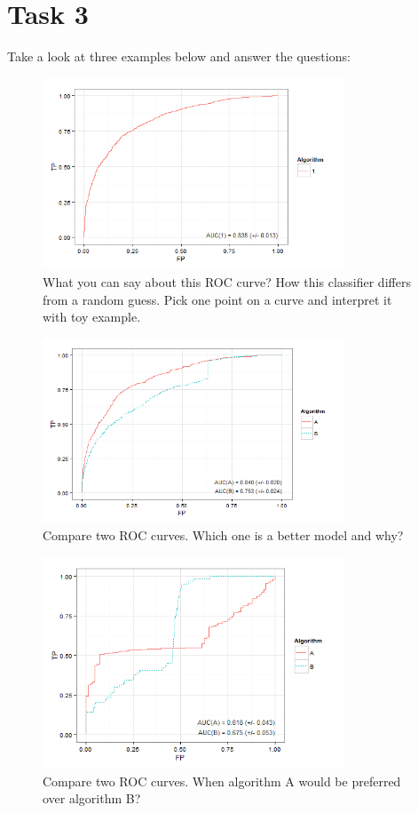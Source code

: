 \documentclass{article}
\begin{document}
\section*{Task 3}
Take a look at three examples below and answer the questions:
\begin{figure}[h!]
  \centering
      \includegraphics[width=0.8\textwidth]{plot1}
  \caption{What you can say about this ROC curve? How this classifier differs from a random guess. Pick one point on a curve and interpret it with toy example.}
\end{figure}
\begin{figure}[h!]
  \centering
      \includegraphics[width=0.8\textwidth]{plot2}
  \caption{Compare two ROC curves. Which one is a better model and why?}
\end{figure}
\begin{figure}[H]
  \centering
      \includegraphics[width=0.8\textwidth]{plot3}
  \caption{Compare two ROC curves. When algorithm A would be preferred over algorithm B?}
\end{figure}
\end{document}
